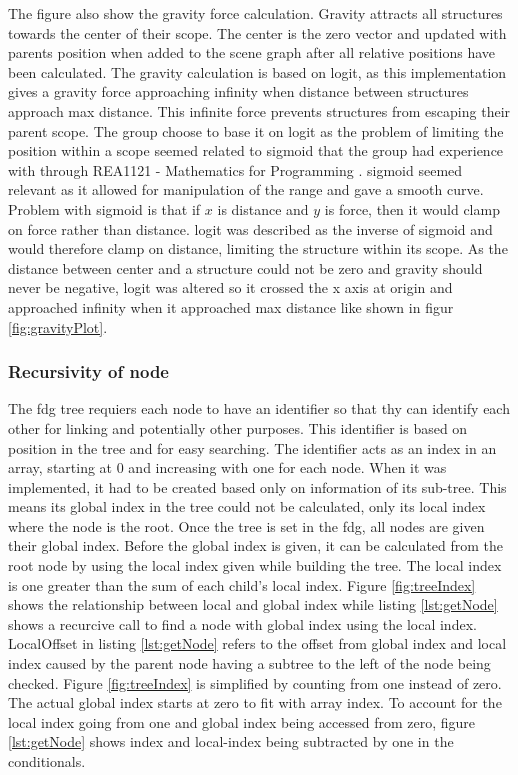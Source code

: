 
The figure also show the gravity force calculation. Gravity attracts all structures towards the center of their scope. The center is the zero vector and updated with parents position when added to the scene graph after all relative positions have been calculated. The gravity calculation is based on \gls{logit}, as this implementation gives a gravity force approaching infinity when distance between structures approach max distance. This infinite force prevents structures from escaping their parent scope. The group choose to base it on \gls{logit} as the problem of limiting the position within a scope seemed related to \gls{sigmoid} that the group had experience with through REA1121 - Mathematics for Programming \cite{course:progMath}. \Gls{sigmoid} seemed relevant as it allowed for manipulation of the range and gave a smooth curve. Problem with \gls{sigmoid} is that if $x$ is distance and $y$ is force, then it would clamp on force rather than distance. \gls{logit} was described as the inverse of \gls{sigmoid} and would therefore clamp on distance, limiting the structure within its scope. As the distance between center and a structure could not be zero and gravity should never be negative, \gls{logit} was altered so it crossed the x axis at origin and approached infinity when it approached max distance like shown in figur \ref{fig:gravityPlot}.

\subsubsection{Recursivity of node}
\label{subsubsec:recuriviryOfNode}


The \gls{fdg} tree requiers each node to have an identifier so that thy can identify each other for linking and potentially other purposes. This identifier is based on position in the tree and for easy searching. The identifier acts as an index in an array, starting at 0 and increasing with one for each node. When it was implemented, it had to be created based only on information of its sub-tree. This means its global index in the tree could not be calculated, only its local index where the node is the root. Once the tree is set in the \gls{fdg}, all nodes are given their global index. Before the global index is given, it can be calculated from the root node by using the local index given while building the tree. The local index is one greater than the sum of each child's local index. Figure \ref{fig:treeIndex} shows the relationship between local and global index while listing \ref{lst:getNode} shows a recurcive call to find a node with global index using the local index. LocalOffset in listing \ref{lst:getNode} refers to the offset from global index and local index caused by the parent node having a subtree to the left of the node being checked. Figure \ref{fig:treeIndex} is simplified by counting from  one instead of zero. The actual global index starts at zero to fit with array index. To account for the local index going from one and global index being accessed from zero, figure \ref{lst:getNode} shows index and local-index being subtracted by one in the conditionals.

